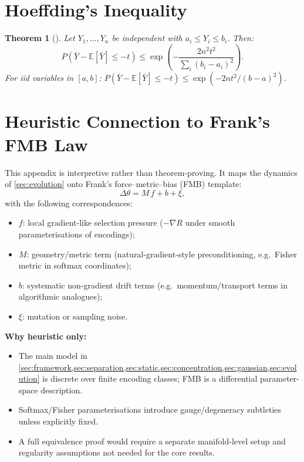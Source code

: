 \documentclass[12pt]{article}
\newtheorem{theorem}{Theorem}[section]
\newcommand{\E}{\mathbb{E}}
\begin{document}
\section{Hoeffding's Inequality}\label{app:hoeffding}

\begin{theorem}[\citealt{hoeffding_1963}]
Let $Y_1, \ldots, Y_n$ be independent with $a_i \le Y_i \le b_i$. Then:
\begin{equation}
P\!\left(\bar{Y} - \E[\bar{Y}] \le -t\right) \le \exp\!\left(-\frac{2n^2 t^2}{\sum_i (b_i - a_i)^2}\right).
\end{equation}
For iid variables in $[a, b]$: $P(\bar{Y} - \E[\bar{Y}] \le -t) \le \exp(-2nt^2/(b-a)^2)$.
\end{theorem}

\section{Heuristic Connection to Frank's FMB Law}\label{app:fmb}

This appendix is interpretive rather than theorem-proving. It maps the dynamics of \cref{sec:evolution} onto Frank's force--metric--bias (FMB) template:
\begin{equation}
\Delta\theta = M\, f + b + \xi,
\end{equation}
with the following correspondences:
\begin{itemize}
\item $f$: local gradient-like selection pressure ($-\nabla R$ under smooth parameterisations of encodings);
\item $M$: geometry/metric term (natural-gradient-style preconditioning, e.g.\ Fisher metric in softmax coordinates);
\item $b$: systematic non-gradient drift terms (e.g.\ momentum/transport terms in algorithmic analogues);
\item $\xi$: mutation or sampling noise.
\end{itemize}

\textbf{Why heuristic only:}
\begin{itemize}
\item The main model in \cref{sec:framework,sec:separation,sec:static,sec:concentration,sec:gaussian,sec:evolution} is discrete over finite encoding classes; FMB is a differential parameter-space description.
\item Softmax/Fisher parameterisations introduce gauge/degeneracy subtleties unless explicitly fixed.
\item A full equivalence proof would require a separate manifold-level setup and regularity assumptions not needed for the core results.
\end{itemize}
\end{document}
